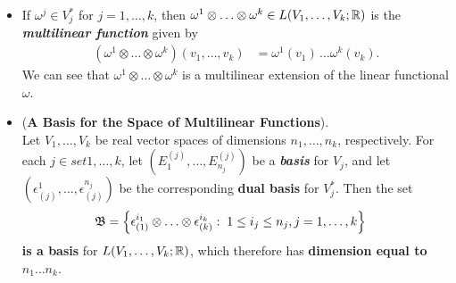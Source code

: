 \documentclass[11pt]{article}
\begin{document}
\begin{itemize}
\item \begin{remark}
If $\omega^j \in V_{j}^{*}$ for $j = 1,\ldots,k$, then $\omega^1\otimes \ldots \otimes \omega^k \in L(V_1,\ldots,V_k ; {\mathbb R})$ is the \emph{\textbf{multilinear function}} given by
\begin{align}
(\omega^1\otimes \ldots \otimes \omega^k)(v_1, \ldots, v_k)&= \omega^1(v_1)\,\ldots \omega^{k}(v_k).  \label{eqn: tensor_product_functionals}
\end{align} We can see that $\omega^1\otimes \ldots \otimes \omega^k$ is a multilinear extension of the linear functional $\omega$.
\end{remark}

\item 
\begin{proposition} (\textbf{A Basis for the Space of Multilinear Functions}). \\
Let $V_1,\ldots,V_k$ be real vector spaces of dimensions $n_1, \ldots, n_k$, respectively. For each $j \in set{1,\ldots,k}$, let $(E_1^{(j)},\ldots, E_{n_j}^{(j)})$ be a \emph{\textbf{basis}} for $V_j$, and let $(\epsilon_{(j)}^{1}, \ldots, \epsilon_{(j)}^{n_j})$ be the corresponding \textbf{dual basis} for $V_j^{*}$. Then the set
\begin{align*}
\mathfrak{B} &=\left\{\epsilon_{(1)}^{i_1} \otimes \ldots \otimes \epsilon_{(k)}^{i_k}: \; 1 \le i_j \le n_j, j=1,\ldots, k\right\}
\end{align*}
\textbf{is a basis} for $L(V_1,\ldots,V_k ; {\mathbb R})$, which therefore has \textbf{dimension equal to} $n_1 \ldots  n_k$.
\end{proposition}
\end{itemize}
\end{document}
